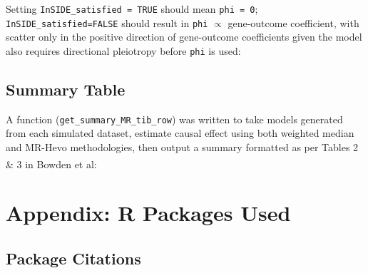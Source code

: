 \documentclass[
]{article}
\begin{document}
\newpage

Setting \texttt{InSIDE\_satisfied\ =\ TRUE} should mean \texttt{phi\ =\ 0}; \texttt{InSIDE\_satisfied=FALSE} should result in \texttt{phi} \(\propto\) gene-outcome coefficient, with scatter only in the positive direction of gene-outcome coefficients given the model also requires directional pleiotropy before \texttt{phi} is used:

\newpage

\subsection{Summary Table}\label{appendix-sim-summ}

A function (\texttt{get\_summary\_MR\_tib\_row}) was written to take models generated from each simulated dataset, estimate causal effect using both weighted median and MR-Hevo methodologies, then output a summary formatted as per Tables 2 \& 3 in Bowden et al\textsuperscript{}:

\newpage

\section{Appendix: R Packages Used}\label{appendix-pkg}

\subsection{Package Citations}\label{package-citations}
\end{document}
